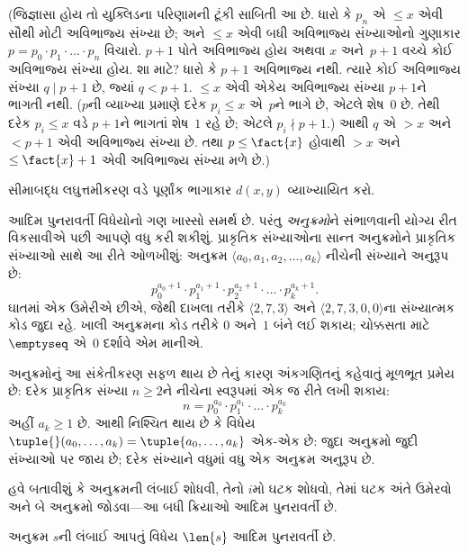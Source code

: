 (જિજ્ઞાસા હોય તો યુક્લિડના પરિણામની ટૂંકી સાબિતી આ છે. ધારો કે
$p_n$ એ $\le x$ એવી સૌથી મોટી અવિભાજ્ય સંખ્યા છે; અને
$\le x$ એવી બધી અવિભાજ્ય સંખ્યાઓનો ગુણાકાર $p =
p_0\cdot p_1 \cdot \dots \cdot p_n$ વિચારો. $p+1$ પોતે અવિભાજ્ય
હોય અથવા $x$ અને~$p+1$ વચ્ચે કોઈ અવિભાજ્ય સંખ્યા હોય. શા માટે?
ધારો કે $p+1$ અવિભાજ્ય નથી. ત્યારે કોઈ અવિભાજ્ય સંખ્યા
$q \mid p+1$ છે, જ્યાં $q < p+1$. $\le x$ એવી એકેય અવિભાજ્ય
સંખ્યા $p+1$ને ભાગતી નથી. ($p$ની વ્યાખ્યા પ્રમાણે દરેક
$p_i \le x$ એ~$p$ને ભાગે છે, એટલે શેષ~$0$ છે. તેથી દરેક
$p_i \le x$ વડે $p+1$ને ભાગતાં શેષ~$1$ રહે છે; એટલે
$p_i \nmid p+1$.) આથી $q$ એ $> x$ અને $< p+1$ એવી અવિભાજ્ય
સંખ્યા છે. તથા $p \le \fact{x}$ હોવાથી $> x$ અને
$\le \fact{x}+1$ એવી અવિભાજ્ય સંખ્યા મળે છે.)

\begin{prob}
સીમાબદ્ધ લઘુત્તમીકરણ વડે પૂર્ણાંક ભાગાકાર $d(x, y)$ વ્યાખ્યાયિત
કરો.
\end{prob}
\endgroup


\begingroup
\makeatletter{}\makeatother

\label{guunit:OLP-0220}


આદિમ પુનરાવર્તી વિધેયોનો ગણ ખાસ્સો સમર્થ છે. પરંતુ
\emph{અનુક્રમો}ને સંભાળવાની યોગ્ય રીત વિકસાવીએ પછી આપણે વધુ કરી
શકીશું. પ્રાકૃતિક સંખ્યાઓના સાન્ત અનુક્રમોને પ્રાકૃતિક સંખ્યાઓ સાથે
આ રીતે ઓળખીશું: અનુક્રમ $\langle a_0, a_1, a_2, \dots, a_k \rangle$
નીચેની સંખ્યાને અનુરૂપ છે:
\[
p_0^{a_0+1} \cdot p_1^{a_1+1} \cdot p_2^{a_2+1} \cdot \dots \cdot
p_k^{a_k+1}.
\]
ઘાતમાં એક ઉમેરીએ છીએ, જેથી દાખલા તરીકે
$\langle 2, 7, 3\rangle$ અને $\langle 2, 7, 3, 0, 0 \rangle$ના
સંખ્યાત્મક કોડ જુદા રહે. ખાલી અનુક્રમના કોડ તરીકે $0$ અને~$1$ બંને
લઈ શકાય; ચોક્કસતા માટે $\emptyseq$ એ~$0$ દર્શાવે એમ માનીએ.

અનુક્રમોનું આ સંકેતીકરણ સફળ થાય છે તેનું કારણ અંકગણિતનું કહેવાતું
મૂળભૂત પ્રમેય છે: દરેક પ્રાકૃતિક સંખ્યા $n \ge 2$ને નીચેના
સ્વરૂપમાં એક જ રીતે લખી શકાય:
\[
n = p_0^{a_0} \cdot p_1^{a_1} \cdot \dots \cdot p_k^{a_k}
\]
અહીં $a_k \ge 1$ છે. આથી નિશ્ચિત થાય છે કે વિધેય
$\tuple{}(a_0,
\dots, a_k) = \tuple{a_0, \dots, a_k}$ એક-એક છે: જુદા
અનુક્રમો જુદી સંખ્યાઓ પર જાય છે; દરેક સંખ્યાને વધુમાં વધુ એક
અનુક્રમ અનુરૂપ છે.

હવે બતાવીશું કે અનુક્રમની લંબાઈ શોધવી, તેનો $i$મો ઘટક શોધવો,
તેમાં ઘટક અંતે ઉમેરવો અને બે અનુક્રમો જોડવા---આ બધી ક્રિયાઓ આદિમ
પુનરાવર્તી છે.

\begin{prop}
  અનુક્રમ $s$ની લંબાઈ આપતું વિધેય $\len{s}$ આદિમ પુનરાવર્તી છે.
\end{prop}

